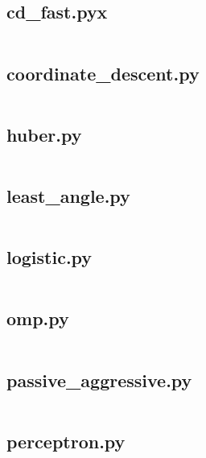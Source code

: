 \documentclass{article}
\begin{document}
\subsection{cd\_fast.pyx}
\inputminted{cython}{/home/dufferzafar/dev/@clones/scikit-learn/sklearn/linear_model/cd_fast.pyx}
\newpage

\subsection{coordinate\_descent.py}
\inputminted{python}{/home/dufferzafar/dev/@clones/scikit-learn/sklearn/linear_model/coordinate_descent.py}
\newpage

\subsection{huber.py}
\inputminted{python}{/home/dufferzafar/dev/@clones/scikit-learn/sklearn/linear_model/huber.py}
\newpage

\subsection{least\_angle.py}
\inputminted{python}{/home/dufferzafar/dev/@clones/scikit-learn/sklearn/linear_model/least_angle.py}
\newpage

\subsection{logistic.py}
\inputminted{python}{/home/dufferzafar/dev/@clones/scikit-learn/sklearn/linear_model/logistic.py}
\newpage

\subsection{omp.py}
\inputminted{python}{/home/dufferzafar/dev/@clones/scikit-learn/sklearn/linear_model/omp.py}
\newpage

\subsection{passive\_aggressive.py}
\inputminted{python}{/home/dufferzafar/dev/@clones/scikit-learn/sklearn/linear_model/passive_aggressive.py}
\newpage

\subsection{perceptron.py}
\inputminted{python}{/home/dufferzafar/dev/@clones/scikit-learn/sklearn/linear_model/perceptron.py}
\newpage
\end{document}
